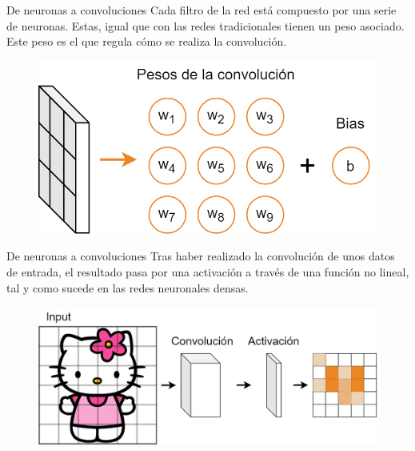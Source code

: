 \begin{frame}{De neuronas a convoluciones}
Cada \alert{filtro} de la red está compuesto por una serie de \alert{neuronas}. Estas, igual que con las redes \alert{tradicionales} tienen un \alert{peso} asociado. Este peso es el que regula cómo se realiza la \alert{convolución}.

\begin{figure}
    \centering
    \includegraphics[width=\textwidth]{figures/Tema 3/ConvNeuron.png}
\end{figure}
\end{frame}

\begin{frame}{De neuronas a convoluciones}
Tras haber realizado la \alert{convolución} de unos datos de entrada, el resultado pasa por una \alert{activación} a través de una \alert{función no lineal}, tal y como sucede en las redes neuronales densas.

\begin{figure}
    \centering
    \includegraphics[width=\textwidth]{figures/Tema 3/ConvActivation.png}
\end{figure}
\end{frame}

